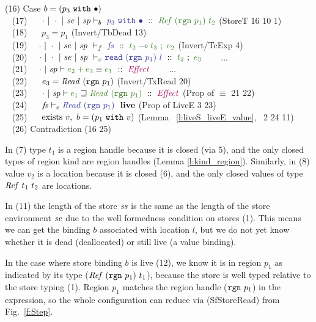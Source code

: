 \begin{tabbing}
(16)    \> Case $b = (p_3 ~\texttt{with}~ \bullet)$
\\
~ (17)  \> ~~ $\TypeB   {\nil}{\nil}
                        {\mse}{\msp}
                        {\sbdead{p_3}}
                        {\tref{(\trgn{p_1})}{t_2}}$
        \> (StoreT 16 10 1)
\\
~ (18)  \> ~~ $p_3 = p_1$
        \> (Invert/TbDead 13)
\\
~ (19)  \> ~~$\TypeF    {\nil}{\nil}{\mse}{\msp}
                        {\mfs}{t_2}{t_3}{e_2}$
        \> (Invert/TcExp 4)
\\
~ (20)  \> ~~$\TypeX    {\nil}{\nil}{\mse}{\msp}
                        {\kread~ (\trgn{p_1})~ l} {t_2} {e_3}$
        \> ~~~ ...
\\
~ (21)  \> ~~$\EquivT   {\nil}{\msp}
                        {e_2 + e_3}
                        {e_1}
                        {\kcEffect}$
        \> ~~~ ...
\\
~ (22)  \> ~~ $e_3 = \mathit{Read}~ (\texttt{rgn}~ p_1)$
        \> (Invert/TxRead 20)
\\
~ (23)  \> ~~ $\SubsT   {\nil}{\msp}{e_1}
                        {\tcRead~ (\trgn{p_1})}
                        {\kcEffect}$
        \> (Prop of $\equiv$ 21 22)
\\
~ (24)  \> ~~ $\LiveE   {\mfs}{\tcRead~ (\trgn{p_1})}$
        \> (Prop of LiveE 3 23)
\\
~ (25)  \> ~~ $\textrm{exists}~ v,~ b = (p_1 ~\texttt{with}~ v)$
        \> \hspace{-2em}(Lemma ~\ref{l:liveS_liveE_value},~  2 24 11)
\\
~ (26)  \> Contradiction
        \> \hspace{-2em}(16 25)
\end{tabbing}

In (7) type $t_1$ is a region handle because it is closed (via 5), and the only closed types of region kind are region handles (Lemma \ref{l:kind_region}). Similarly, in (8) value $v_2$ is a location because it is closed (6), and the only closed values of type $\mathit{Ref}~ t_1~ t_2$ are locations.

In (11) the length of the store $\mathit{ss}$ is the same as the length of the store environment $\mathit{se}$ due to the well formedness condition on stores (1). This means we can get the binding $b$ associated with location $l$, but we do not yet know whether it is dead (deallocated) or still live (a value binding).

In the case where store binding $b$ is live (12), we know it is in region $p_1$ as indicated by its type ($\mathit{Ref}~ (\texttt{rgn}~ p_1)~ t_1$), because the store is well typed relative to the store typing (1). Region $p_1$ matches the region handle ($\texttt{rgn}~ p_1$) in the expression, so the whole configuration can reduce via (SfStoreRead) from Fig.~\ref{f:Step}.

